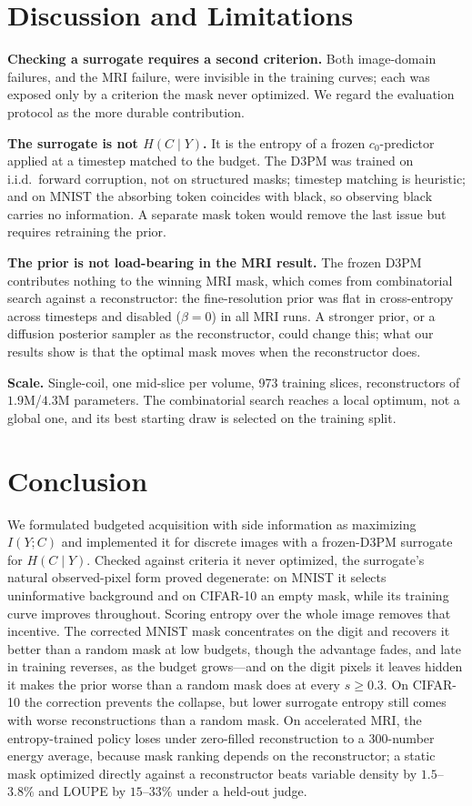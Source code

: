 \documentclass{article}
\begin{document}
\section{Discussion and Limitations}

\textbf{Checking a surrogate requires a second criterion.} Both image-domain failures, and the MRI failure, were invisible in the training curves; each was exposed only by a criterion the mask never optimized. We regard the evaluation protocol as the more durable contribution.

\textbf{The surrogate is not $H(C \mid Y)$.} It is the entropy of a frozen $c_0$-predictor applied at a timestep matched to the budget. The D3PM was trained on i.i.d.\ forward corruption, not on structured masks; timestep matching is heuristic; and on MNIST the absorbing token coincides with black, so observing black carries no information. A separate mask token would remove the last issue but requires retraining the prior.

\textbf{The prior is not load-bearing in the MRI result.} The frozen D3PM contributes nothing to the winning MRI mask, which comes from combinatorial search against a reconstructor: the fine-resolution prior was flat in cross-entropy across timesteps and disabled ($\beta = 0$) in all MRI runs. A stronger prior, or a diffusion posterior sampler as the reconstructor, could change this; what our results show is that the optimal mask moves when the reconstructor does.

\textbf{Scale.} Single-coil, one mid-slice per volume, 973 training slices, reconstructors of $1.9$M/$4.3$M parameters. The combinatorial search reaches a local optimum, not a global one, and its best starting draw is selected on the training split.

\section{Conclusion}

We formulated budgeted acquisition with side information as maximizing $I(Y;C)$ and implemented it for discrete images with a frozen-D3PM surrogate for $H(C \mid Y)$. Checked against criteria it never optimized, the surrogate's natural observed-pixel form proved degenerate: on MNIST it selects uninformative background and on CIFAR-10 an empty mask, while its training curve improves throughout. Scoring entropy over the whole image removes that incentive. The corrected MNIST mask concentrates on the digit and recovers it better than a random mask at low budgets, though the advantage fades, and late in training reverses, as the budget grows---and on the digit pixels it leaves hidden it makes the prior worse than a random mask does at every $s \ge 0.3$. On CIFAR-10 the correction prevents the collapse, but lower surrogate entropy still comes with worse reconstructions than a random mask. On accelerated MRI, the entropy-trained policy loses under zero-filled reconstruction to a 300-number energy average, because mask ranking depends on the reconstructor; a static mask optimized directly against a reconstructor beats variable density by $1.5$--$3.8\%$ and LOUPE by $15$--$33\%$ under a held-out judge.
\end{document}
